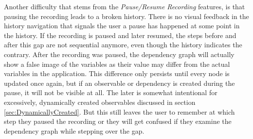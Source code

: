 Another difficulty that stems from the \emph{Pause/Resume Recording} features, is that pausing the recording leads to a broken history. There is no visual feedback in the history navigation that signals the user a pause has happened at some point in the history. If the recording is paused and later resumed, the steps before and after this gap are not sequential anymore, even though the history indicates the contrary. After the recording was paused, the dependency graph will actually show a false image of the variables as their value may differ from the actual variables in the application. This difference only persists until every node is updated once again, but if an observable or dependency is created during the pause, it will not be visible at all. The later is somewhat intentional for excessively, dynamically created observables discussed in section \ref{sec:DynamicallyCreated}. But this still leaves the user to remember at which step they paused the recording or they will get confused if they examine the dependency graph while stepping over the gap.
	
